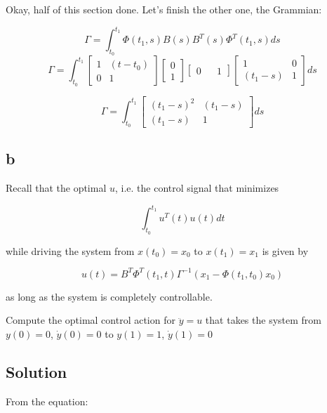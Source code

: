\documentclass[10pt,a4paper]{article}
\begin{document}
Okay, half of this section done. Let's finish the other one, the Grammian:

\[ \Gamma = \int_{t_{0}}^{t_{1}} \Phi(t_{1}, s)B(s)B^{T}(s)\Phi^{T}(t_{1}, s)ds \]
\[ \Gamma = \int_{t_{0}}^{t_{1}} 
\begin{bmatrix} 1 & (t - t_{0}) \\ 0 & 1 \end{bmatrix}
\begin{bmatrix} 0 \\ 1 \end{bmatrix}
\begin{bmatrix} 0 && 1 \end{bmatrix}
\begin{bmatrix} 1 & 0 \\ (t_{1} - s) & 1 \end{bmatrix} ds \]

\[ \Gamma = \int_{t_{0}}^{t_{1}} 
\begin{bmatrix} 
(t_{1} - s)^{2} & (t_{1} - s) \\ 
(t_{1} - s) & 1 
\end{bmatrix} ds \]

\begin{center}
\end{center}


\subsection*{b}
Recall that the optimal $u$, i.e. the control signal that minimizes

\[ \int_{t_{0}}^{t_{1}} u^{T}(t)u(t)dt \]

while driving the system from $x(t_{0}) = x_{0}$ to $x(t_{1}) = x_{1}$ is given by

\[ u(t) = B^{T}\Phi^{T}(t_{1},t)\Gamma^{-1}(x_{1} - \Phi(t_{1}, t_{0})x_{0}) \]

as long as the system is completely controllable.

Compute the optimal control action for $\ddot{y} = u$ that takes the system from $y(0) = 0$, $\dot{y}(0) = 0$ to $y(1) = 1$, $\dot{y}(1) = 0$ 
  
\subsection*{Solution}
From the equation:
\end{document}
